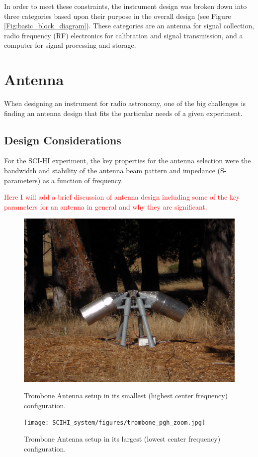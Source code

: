 In order to meet these constraints, the instrument design was broken down into three categories based upon their purpose in the overall design (see Figure \ref{Fig:basic_block_diagram}). These categories are an antenna for signal collection, radio frequency (RF) electronics for calibration and signal transmission, and a computer for signal processing and storage.

\section{Antenna}
When designing an instrument for radio astronomy, one of the big challenges is finding an antenna design that fits the particular needs of a given experiment. 

\subsection{Design Considerations}
For the SCI-HI experiment, the key properties for the antenna selection were the bandwidth and stability of the antenna beam pattern and impedance (S-parameters) as a function of frequency. 



\textcolor{red}{Here I will add a brief discussion of antenna design including some of the key parameters for an antenna in general and why they are significant. }

\begin{figure}[htb]
\centering
\begin{minipage}[b]{0.45\textwidth}
\centering
\includegraphics[width=0.95\linewidth]{SCIHI_system/figures/trombone_guad_small.jpg}
\caption{Trombone Antenna setup in its smallest (highest center frequency) configuration.}
\label{Fig:trombone_small}
\end{minipage}%
\begin{minipage}[b]{0.02\textwidth}
\hspace{1cm}
\end{minipage}%
\begin{minipage}[b]{0.51\textwidth}
\centering
\texttt{[image: SCIHI\_system/figures/trombone\_pgh\_zoom.jpg]}
\caption{Trombone Antenna setup in its largest (lowest center frequency) configuration.}
\label{Fig:trombone_large}
\end{minipage}
\end{figure}

